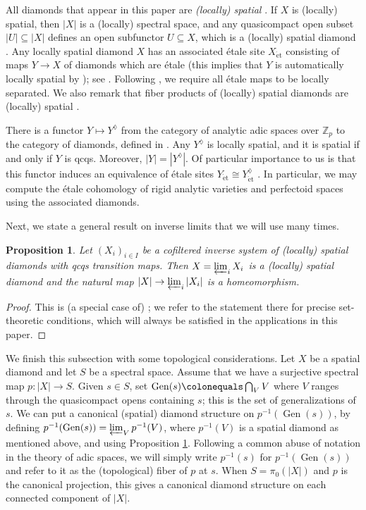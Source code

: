 \documentclass{amsart}
\newtheorem{prop}[subsubsection]{Proposition}
\theoremstyle{remark}
\numberwithin{equation}{subsection}
\newcommand{\Z}{\ZZ}
\newcommand{\ZZ}{{\mathbb Z}}
\newcommand{\Zp}{\Z_p}
\DeclareMathOperator{\Gen}{Gen}
\newcommand{\et}{\mathrm{\acute{e}t}}
\newcommand{\defeq}{\colonequals}
\renewcommand{\(}{\left(}
\renewcommand{\)}{\right)}
\begin{document}
All diamonds that appear in this paper are \emph{(locally) spatial} \cite[Definition 11.17]{diamonds}. If $X$ is (locally) spatial, then $|X|$ is a (locally) spectral space, and any quasicompact open subset $|U| \subseteq |X|$ defines an open subfunctor $U\subseteq X$, which is a (locally) spatial diamond \cite[Proposition 11.18, 11.19]{diamonds}. Any locally spatial diamond $X$ has an associated \'etale site $X_{\et}$ consisting of maps $Y \to X$ of diamonds which are \'etale (this implies that $Y$ is automatically locally spatial by \cite[Corollary 11.28]{diamonds}); see \cite[Definition 14.1]{diamonds}. Following \cite[Convention 10.2]{diamonds}, we require all \'etale maps to be locally separated. We also remark that fiber products of (locally) spatial diamonds are (locally) spatial \cite[Corollary 11.29]{diamonds}.

\medskip

There is a functor $Y \mapsto Y^{\lozenge}$ from the category of analytic adic spaces over $\Zp$ to the category of diamonds, defined in \cite[\S 15]{diamonds}. Any $Y^{\lozenge}$ is locally spatial, and it is spatial if and only if $Y$ is qcqs. Moreover, $|Y|=|Y^{\lozenge}|$. Of particular importance to us is that this functor induces an equivalence of \'etale sites $Y_{\et}\cong Y_{\et}^{\lozenge}$ \cite[Lemma 15.6]{diamonds}. In particular, we may compute the \'etale cohomology of rigid analytic varieties and perfectoid spaces using the associated diamonds.

\medskip

Next, we state a general result on inverse limits that we will use many times.

\begin{prop}\label{inverselimit}
Let $(X_{i})_{i\in I}$ be a cofiltered inverse system of (locally) spatial diamonds with qcqs transition maps. Then $X=\varprojlim_{i}X_{i}$ is a (locally) spatial diamond and the natural map $|X| \to \varprojlim_{i}|X_{i}|$ is a homeomorphism.
\end{prop}

\begin{proof}
This is (a special case of) \cite[Lemma 11.22]{diamonds}; we refer to the statement there for precise set-theoretic conditions, which will always be satisfied in the applications in this paper.
\end{proof}

We finish this subsection with some topological considerations. Let $X$ be a spatial diamond and let $S$ be a spectral space. Assume that we have a surjective spectral map $p \colon |X| \to S$. Given $s\in S$, set $\Gen(s)\defeq \bigcap_{V}V$ where $V$ ranges through the quasicompact opens containing $s$; this is the set of generalizations of $s$. We can put a canonical (spatial) diamond structure on $p^{-1}(\Gen(s))$, by defining $p^{-1}(\Gen(s))=\varprojlim_{V}p^{-1}(V)$, where $p^{-1}(V)$ is a spatial diamond as mentioned above, and using Proposition \ref{inverselimit}. Following a common abuse of notation in the theory of adic spaces, we will simply write $p^{-1}(s)$ for $p^{-1}(\Gen(s))$ and refer to it as the (topological) fiber of $p$ at $s$. When $S=\pi_{0}(|X|)$ and $p$ is the canonical projection, this gives a canonical diamond structure on each connected component of $|X|$.
\end{document}

